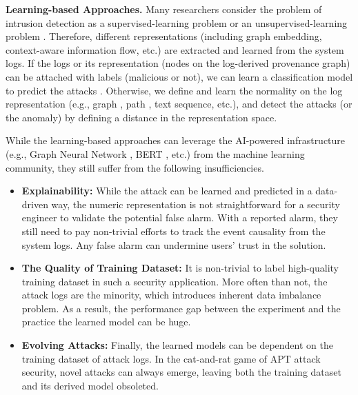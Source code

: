 \noindent\textbf{Learning-based Approaches.}
Many researchers consider the problem of intrusion detection as a supervised-learning problem \cite{liu2018towards,hassan2019nodoze,hassan2020we} or an unsupervised-learning problem \cite{wang2022threatrace,han2020unicorn,wang2020you}.
Therefore, different representations \cite{zeng2021watson, zengy2022shadewatcher} (including graph embedding, context-aware information flow, etc.) are extracted and learned from the system logs.
If the logs or its representation (nodes on the log-derived provenance graph) can be attached with labels (malicious or not),
we can learn a classification model to predict the attacks \cite{xxx}.
Otherwise, we define and learn the normality on the log representation (e.g., graph \cite{manzoor2016fast,han2020unicorn,li2021hierarchical,yang2023prographer,cheng2023kairos}, path \cite{wang2020you,alsaheel2021atlas}, text sequence, etc.), and detect the attacks (or the anomaly) by
defining a distance in the representation space.

While the learning-based approaches can leverage 
the AI-powered infrastructure (e.g., Graph Neural Network \cite{xx}, BERT \cite{xx}, etc.) from the machine learning community,
they still suffer from the following insufficiencies.

\begin{itemize}[leftmargin=*]
  \item \textbf{Explainability:}
    While the attack can be learned and predicted in a data-driven way,
    the numeric representation is not straightforward for a security engineer to 
    validate the potential false alarm.
    With a reported alarm, they still need to pay non-trivial efforts to 
    track the event causality from the system logs.
    Any false alarm can undermine users' trust in the solution.
  \item \textbf{The Quality of Training Dataset:}
    It is non-trivial to label high-quality training dataset in such a security application.
    More often than not, the attack logs are the minority, which introduces inherent data imbalance problem.
    As a result, the performance gap between the experiment and the practice the learned model can be huge.
  \item \textbf{Evolving Attacks:}
    Finally, the learned models can be dependent on the training dataset of attack logs.
    In the cat-and-rat game of APT attack security,
    novel attacks can always emerge, 
    leaving both the training dataset and its derived model obsoleted.
\end{itemize}


